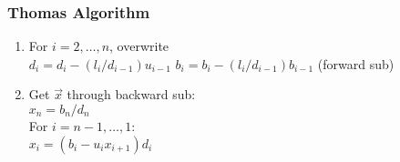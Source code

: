 \documentclass[12pt]{article}
\begin{document}
\subsubsection*{Thomas Algorithm}
\begin{enumerate}
\item For $i=2, \dots, n$, overwrite\\
  \hspace*{1 em} $d_i = d_i - (l_i / d_{i-1}) u_{i-1}$
  \hspace*{1 em} $b_i = b_i - (l_i / d_{i-1}) b_{i-1}$ (forward sub)

\item Get $\vec{x}$ through backward sub:\\
$x_n = b_n / d_n$\\
For $i = n-1, \dots, 1$:\\
  \hspace*{1 em} $x_i = (b_i - u_i x_{i+1}) d_i$
\end{enumerate}



 
\end{document}
